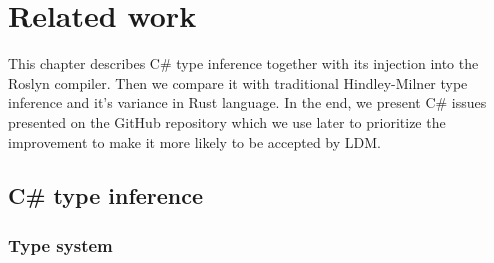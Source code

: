 \chapter{Related work}

This chapter describes C\# type inference together with its injection into the Roslyn compiler.
Then we compare it with traditional Hindley-Milner type inference and it's variance in Rust language.
In the end, we present C\# issues presented on the GitHub repository which we use later to prioritize the improvement to make it more likely to be accepted by \ac{LDM}.

\section{C\# type inference}

\subsection{Type system}

